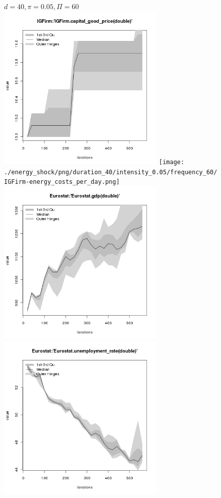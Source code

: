 \begin{figure}[ht!]
\centering\leavevmode
\begin{minipage}{17cm}
\centering\leavevmode
{$d=40, \pi=0.05, \Pi=60$}\\
\includegraphics[width=8cm]{./energy_shock/png/duration_40/intensity_0.05/frequency_60/IGFirm-capital_good_price.png}
\texttt{[image: ./energy\_shock/png/duration\_40/intensity\_0.05/frequency\_60/IGFirm-energy\_costs\_per\_day.png]}
\includegraphics[width=8cm]{./energy_shock/png/duration_40/intensity_0.05/frequency_60/Eurostat-gdp.png}
\includegraphics[width=8cm]{./energy_shock/png/duration_40/intensity_0.05/frequency_60/Eurostat-unemployment_rate.png}
\end{minipage}
\end{figure}

